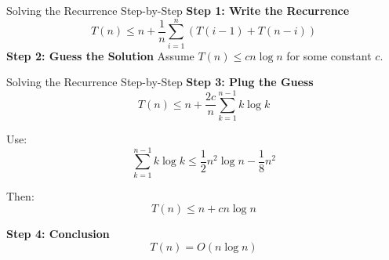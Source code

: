 \begin{frame}{Solving the Recurrence Step-by-Step}
  \textbf{Step 1: Write the Recurrence}
  \[
    T(n) \leq n + \frac{1}{n} \sum_{i=1}^n (T(i-1) + T(n-i))
  \]
  \textbf{Step 2: Guess the Solution}
  Assume $T(n) \leq cn \log n$ for some constant $c$.

\end{frame}
\begin{frame}{Solving the Recurrence Step-by-Step}
  \textbf{Step 3: Plug the Guess}
  \[
    T(n) \leq n + \frac{2c}{n} \sum_{k=1}^{n-1} k \log k
  \]

  Use:
  \[
    \sum_{k=1}^{n-1} k \log k \leq \frac{1}{2}n^2 \log n - \frac{1}{8}n^2
  \]

  Then:
  \[
    T(n) \leq n + c n \log n
  \]

  \textbf{Step 4: Conclusion}
  \[
    T(n) = O(n \log n)
  \]
\end{frame}